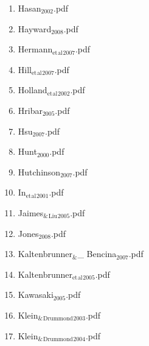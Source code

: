 \documentclass[11pt]{article}
\begin{document}
\begin{enumerate}
\begin{enumerate}
\item Hasan$_{\text{2002}}$.pdf
\label{sec-1-1-1-1-11-19-17-64}

\item Hayward$_{\text{2008}}$.pdf
\label{sec-1-1-1-1-11-19-17-65}

\item Hermann$_{\text{et}}$$_{\text{al}}$$_{\text{2007}}$.pdf
\label{sec-1-1-1-1-11-19-17-66}

\item Hill$_{\text{et}}$$_{\text{al}}$$_{\text{2007}}$.pdf
\label{sec-1-1-1-1-11-19-17-67}

\item Holland$_{\text{et}}$$_{\text{al}}$$_{\text{2002}}$.pdf
\label{sec-1-1-1-1-11-19-17-68}

\item Hribar$_{\text{2005}}$.pdf
\label{sec-1-1-1-1-11-19-17-69}

\item Hsu$_{\text{2007}}$.pdf
\label{sec-1-1-1-1-11-19-17-70}

\item Hunt$_{\text{2000}}$.pdf
\label{sec-1-1-1-1-11-19-17-71}

\item Hutchinson$_{\text{2007}}$.pdf
\label{sec-1-1-1-1-11-19-17-72}

\item In$_{\text{et}}$$_{\text{al}}$$_{\text{2001}}$.pdf
\label{sec-1-1-1-1-11-19-17-73}

\item Jaimes$_{\text{\&}}$$_{\text{Liu}}$$_{\text{2005}}$.pdf
\label{sec-1-1-1-1-11-19-17-74}

\item Jones$_{\text{2008}}$.pdf
\label{sec-1-1-1-1-11-19-17-75}

\item Kaltenbrunner$_{\text{\&}}$\_ Bencina$_{\text{2007}}$.pdf
\label{sec-1-1-1-1-11-19-17-76}

\item Kaltenbrunner$_{\text{et}}$$_{\text{al}}$$_{\text{2005}}$.pdf
\label{sec-1-1-1-1-11-19-17-77}

\item Kawasaki$_{\text{2005}}$.pdf
\label{sec-1-1-1-1-11-19-17-78}

\item Klein$_{\text{\&}}$$_{\text{Drummond}}$$_{\text{2003}}$.pdf
\label{sec-1-1-1-1-11-19-17-79}

\item Klein$_{\text{\&}}$$_{\text{Drummond}}$$_{\text{2004}}$.pdf
\label{sec-1-1-1-1-11-19-17-80}


\end{enumerate}
\end{enumerate}
\end{document}
